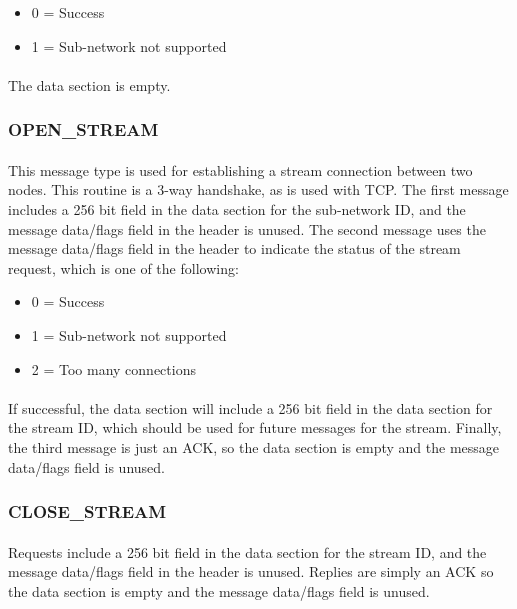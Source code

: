 \documentclass{article}
\begin{document}
\begin{itemize}
\item 0 = Success
\item 1 = Sub-network not supported
\end{itemize}

\paragraph{}
The data section is empty.

\subsubsection{OPEN\_STREAM}

\paragraph{}
This message type is used for establishing a stream connection between two nodes.
This routine is a 3-way handshake, as is used with TCP.
The first message includes a 256 bit field in the data section for the sub-network ID, and the message data/flags field in the header is unused.
The second message uses the message data/flags field in the header to indicate the status of the stream request, which is one of the following:

\begin{itemize}
\item 0 = Success
\item 1 = Sub-network not supported
\item 2 = Too many connections
\end{itemize}

\paragraph{}
If successful, the data section will include a 256 bit field in the data section for the stream ID, which should be used for future messages for the stream.
Finally, the third message is just an ACK, so the data section is empty and the message data/flags field is unused.

\subsubsection{CLOSE\_STREAM}

\paragraph{}
Requests include a 256 bit field in the data section for the stream ID, and the message data/flags field in the header is unused.
Replies are simply an ACK so the data section is empty and the message data/flags field is unused.
\end{document}
